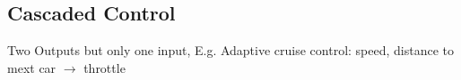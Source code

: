 \subsection{Cascaded Control}
    Two Outputs but only one input, E.g. Adaptive cruise control: speed, distance to mext car $\rightarrow$ throttle